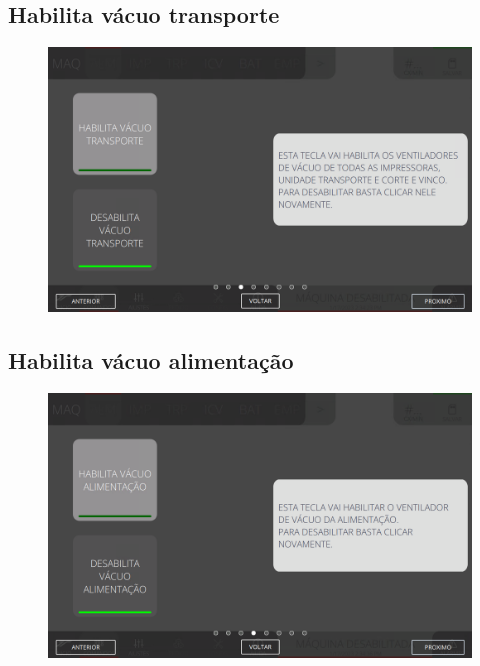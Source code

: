\subsection{Habilita vácuo transporte}
\begin{figure}
    \centering
    \includegraphics[width=576 px,height=360 px]{src/imagesICV/03-feeder/commands/4.png}
\end{figure}

\newpage
\thispagestyle{fancy}
\vspace{\fill}

\subsection{Habilita vácuo alimentação}
\begin{figure}
    \centering
    \includegraphics[width=576 px,height=360 px]{src/imagesICV/03-feeder/commands/5.png}
\end{figure}
\newpage
\thispagestyle{fancy}
\vspace{\fill}


